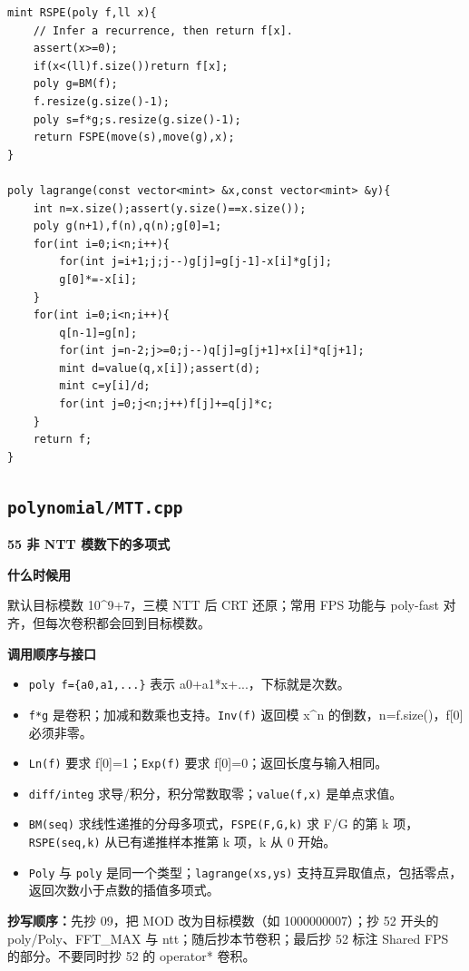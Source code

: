 \documentclass[UTF8,a4paper,10pt]{ctexart}
\newcommand{\TemplUsage}[1]{\textbf{什么时候用}\par #1\par}
\newcommand{\TemplApi}[1]{\textbf{调用顺序与接口}\par #1\par}
\begin{document}
\begin{lstlisting}[firstnumber=1]
mint RSPE(poly f,ll x){
	// Infer a recurrence, then return f[x].
	assert(x>=0);
	if(x<(ll)f.size())return f[x];
	poly g=BM(f);
	f.resize(g.size()-1);
	poly s=f*g;s.resize(g.size()-1);
	return FSPE(move(s),move(g),x);
}

poly lagrange(const vector<mint> &x,const vector<mint> &y){
	int n=x.size();assert(y.size()==x.size());
	poly g(n+1),f(n),q(n);g[0]=1;
	for(int i=0;i<n;i++){
		for(int j=i+1;j;j--)g[j]=g[j-1]-x[i]*g[j];
		g[0]*=-x[i];
	}
	for(int i=0;i<n;i++){
		q[n-1]=g[n];
		for(int j=n-2;j>=0;j--)q[j]=g[j+1]+x[i]*q[j+1];
		mint d=value(q,x[i]);assert(d);
		mint c=y[i]/d;
		for(int j=0;j<n;j++)f[j]+=q[j]*c;
	}
	return f;
}
\end{lstlisting}
\par\vspace{1em}
\subsection{\texttt{polynomial/MTT.cpp}}
\textbf{55 非 NTT 模数下的多项式}

\TemplUsage{默认目标模数 10\textasciicircum{}9+7，三模 NTT 后 CRT 还原；常用 FPS 功能与 poly-fast 对齐，但每次卷积都会回到目标模数。}
\TemplApi{\begin{itemize}
\item \texttt{poly f=\{a0,a1,...\}} 表示 a0+a1*x+...，下标就是次数。
\item \texttt{f*g} 是卷积；加减和数乘也支持。\texttt{Inv(f)} 返回模 x\textasciicircum{}n 的倒数，n=f.size()，f[0] 必须非零。
\item \texttt{Ln(f)} 要求 f[0]=1；\texttt{Exp(f)} 要求 f[0]=0；返回长度与输入相同。
\item \texttt{diff/integ} 求导/积分，积分常数取零；\texttt{value(f,x)} 是单点求值。
\item \texttt{BM(seq)} 求线性递推的分母多项式，\texttt{FSPE(F,G,k)} 求 F/G 的第 k 项，\texttt{RSPE(seq,k)} 从已有递推样本推第 k 项，k 从 0 开始。
\item \texttt{Poly} 与 \texttt{poly} 是同一个类型；\texttt{lagrange(xs,ys)} 支持互异取值点，包括零点，返回次数小于点数的插值多项式。
\end{itemize}}
\textbf{抄写顺序：}先抄 09，把 MOD 改为目标模数（如 1000000007）；抄 52 开头的 poly/Poly、FFT\_MAX 与 ntt；随后抄本节卷积；最后抄 52 标注 Shared FPS 的部分。不要同时抄 52 的 operator* 卷积。
\end{document}
